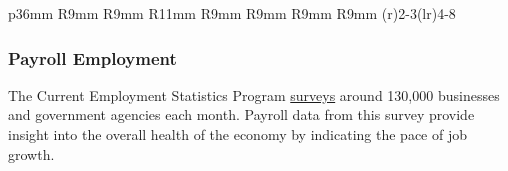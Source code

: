 \begin{minipage}{0.76\textwidth}
\vspace{1mm}

\small 
\vspace{2mm}

\vspace*{-3mm}

 \setlength{\tabcolsep}{3.5pt} \color{black!90}
	{\renewcommand{\arraystretch}{1.65}
		 \begin{tabular}{p{36mm} R{9mm} R{9mm} R{11mm} R{9mm} R{9mm} R{9mm} R{9mm}}
		 \cmidrule(r){2-3}\cmidrule(lr){4-8}
		 \hline
		\end{tabular}}
\end{minipage}
\newpage
\vspace*{-12mm} \hypertarget{nfplt}{}

\subsubsection*{Payroll Employment}
\begin{minipage}{0.76\textwidth}  
\small The Current Employment Statistics Program \href{https://www.bls.gov/ces/}{surveys} around 130,000 businesses and government agencies each month. Payroll data from this survey provide insight into the overall health of the economy by indicating the pace of job growth. 
\end{minipage}

